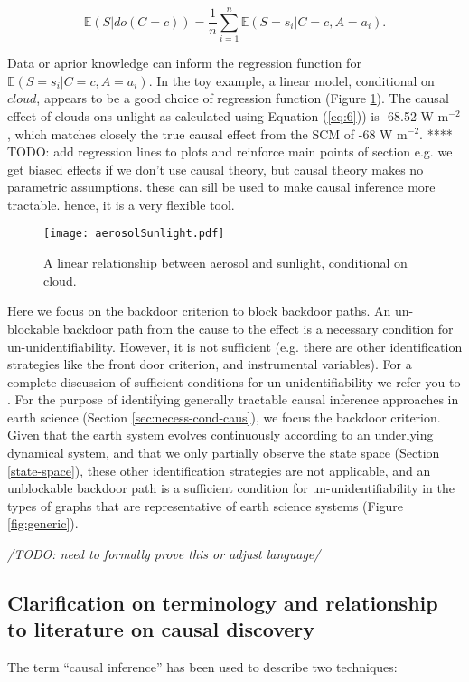 \documentclass[12pt]{article}
\begin{document}
\begin{equation}
  \mathbb{E}(S | do(C = c))  = \frac{1}{n} \sum_{i=1}^n \mathbb{E}(S=s_i |
  C=c, A=a_i).
  \label{eq:6}
\end{equation}

Data or aprior knowledge can inform the regression function for
$\mathbb{E}(S=s_i | C=c, A=a_i)$. In the toy example, a linear model,
conditional on $cloud$, appears to be a good choice of regression
function (Figure \ref{fig:linear}). The causal effect of clouds ons
unlight as calculated using Equation (\ref{eq:6})) is -68.52 W
m$^{-2}$, which matches closely the true causal effect from the SCM of
-68 W m$^{-2}$.  **** TODO: add regression lines to plots and
reinforce main points of section e.g. we get biased effects if we
don't use causal theory, but causal theory makes no parametric
assumptions. these can sill be used to make causal inference more
tractable. hence, it is a very flexible tool.

\begin{figure}
  \texttt{[image: aerosolSunlight.pdf]}
  \caption{A linear relationship between aerosol and sunlight,
    conditional on cloud.}
  \label{fig:linear}
\end{figure}

Here we focus on the backdoor criterion to block backdoor paths. An
un-blockable backdoor path from the cause to the effect is a necessary
condition for un-unidentifiability. However, it is not sufficient
(e.g. there are other identification strategies like the front door
criterion, and instrumental variables). For a complete discussion of
sufficient conditions for un-unidentifiability we refer you to
\citet{shpitser2006}. For the purpose of identifying generally
tractable causal inference approaches in earth science (Section
\ref{sec:necess-cond-caus}), we focus the backdoor criterion. Given
that the earth system evolves continuously according to an underlying
dynamical system, and that we only partially observe the state space
(Section \ref{state-space}), these other identification strategies are
not applicable, and an unblockable backdoor path is a sufficient
condition for un-unidentifiability in the types of graphs that are
representative of earth science systems (Figure \ref{fig:generic}).

\textit{/TODO: need to formally prove this or adjust language/}

\subsection{Clarification on terminology and relationship to literature on causal discovery}
\label{sec:discovery}
The term ``causal inference'' has been used to describe two
techniques:
\end{document}
